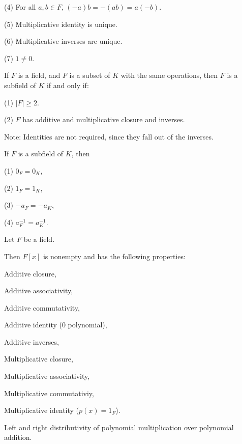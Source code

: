 \documentclass{article}
\begin{document}
    \indent\indent (4) For all $a,b \in F$, $(-a)b=-(ab)=a(-b)$.
    
    \indent\indent (5) Multiplicative identity is unique.
    
    \indent\indent (6) Multiplicative inverses are unique.
    
    \indent\indent (7) $1 \neq 0$.


     If $F$ is a field, and $F$ is a subset of $K$ with the same operations,
     then $F$ is a subfield of $K$ if and only if:
     
     \indent\indent (1) $|F| \geq 2$.
     
     \indent\indent (2) $F$ has additive and multiplicative closure and inverses.
     
     \indent\indent Note: Identities are not required, since they fall out of the inverses.


    If $F$ is a subfield of $K$, then
    
    \indent\indent (1) $0_F = 0_K$,
    
    \indent\indent (2) $1_F = 1_K$,

    \indent\indent (3) $-a_F=-a_K$,
    
    \indent\indent (4) $a^{-1}_F=a^{-1}_K$.

\newpage


    Let $F$ be a field.
    
    Then $F[x]$ is nonempty and has the following properties:
    
    \indent\indent Additive closure,

    \indent\indent Additive associativity,

    \indent\indent Additive commutativity,

    \indent\indent Additive identity (0 polynomial),

    \indent\indent Additive inverses,

    \indent\indent Multiplicative closure,

    \indent\indent Multiplicative associativity,

    \indent\indent Multiplicative commutativiy,

    \indent\indent Multiplicative identity ($p(x)=1_F$).
    
    \indent\indent Left and right distributivity of polynomial multiplication over polynomial addition.
    
\end{document}
